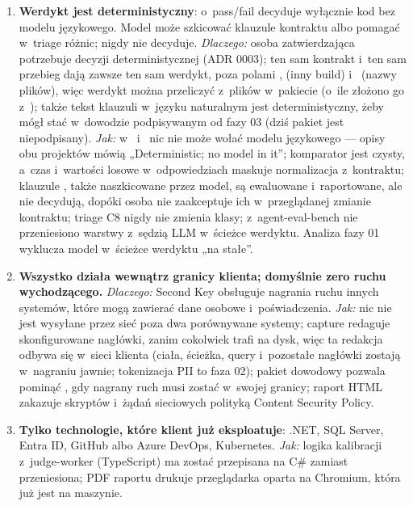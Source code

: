 \begin{enumerate}
  \item \textbf{Werdykt jest deterministyczny}: o~pass/fail decyduje wyłącznie kod bez modelu
        językowego. Model może szkicować klauzule kontraktu albo pomagać w~triage różnic;
        nigdy nie decyduje. \emph{Dlaczego:} osoba zatwierdzająca potrzebuje decyzji
        deterministycznej (ADR 0003); ten sam kontrakt i~ten sam przebieg dają zawsze ten
        sam werdykt, poza polami ,  (inny build) i~ (nazwy plików), więc werdykt można przeliczyć z~plików
        w~pakiecie (o~ile złożono go z~); także tekst klauzuli w~języku naturalnym jest deterministyczny, żeby
        mógł stać w~dowodzie podpisywanym od fazy 03 (dziś pakiet jest niepodpisany). \emph{Jak:} w~ i~ nic nie może wołać modelu językowego --- opisy obu
        projektów mówią „Deterministic; no model in it”; komparator jest czysty, a~czas i~wartości losowe w~odpowiedziach maskuje normalizacja z~kontraktu; klauzule
        , także naszkicowane przez model, są ewaluowane i~raportowane,
        ale nie decydują, dopóki osoba nie zaakceptuje ich w~przeglądanej zmianie kontraktu;
        triage C8 nigdy nie zmienia klasy; z~agent-eval-bench nie przeniesiono warstwy z~sędzią LLM w~ścieżce werdyktu. Analiza fazy 01 wyklucza model w~ścieżce werdyktu
        „na stałe”.
  \item \textbf{Wszystko działa wewnątrz granicy klienta; domyślnie zero ruchu
        wychodzącego.} \emph{Dlaczego:} Second Key obsługuje nagrania ruchu innych systemów,
        które mogą zawierać dane osobowe i~poświadczenia. \emph{Jak:} nic nie jest wysyłane
        przez sieć poza dwa porównywane systemy; capture redaguje skonfigurowane nagłówki,
        zanim cokolwiek trafi na dysk, więc ta redakcja odbywa się w~sieci klienta (ciała,
        ścieżka, query i~pozostałe nagłówki zostają w~nagraniu jawnie; tokenizacja PII to
        faza 02); pakiet
        dowodowy pozwala pominąć , gdy nagrany ruch musi zostać w~swojej
        granicy; raport HTML zakazuje skryptów i~żądań sieciowych polityką Content Security
        Policy.
  \item \textbf{Tylko technologie, które klient już eksploatuje}: .NET, SQL Server, Entra
        ID, GitHub albo Azure DevOps, Kubernetes. \emph{Jak:} logika kalibracji z~judge-worker (TypeScript) ma zostać przepisana na C\# zamiast przeniesiona; PDF
        raportu drukuje przeglądarka oparta na Chromium, która już jest na maszynie.

\end{enumerate}
